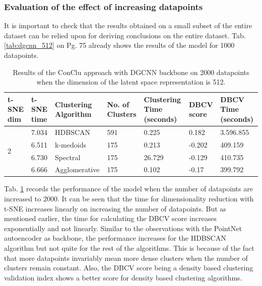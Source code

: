\subsubsection{Evaluation of the effect of increasing datapoints} 
It is important to check that the results obtained on a small subset of the entire dataset can be relied upon for deriving conclusions on the entire dataset. Tab. \ref{tab:dgcnn_512} on Pg. 75 already shows the results of the model for 1000 datapoints.
\begin{table}[H]
  \setlength\extrarowheight{10pt}
  \caption{Results of the ConClu approach with \ac{DGCNN} backbone on 2000 datapoints when the dimension of the latent space representation is 512.}
  \centering
  \begin{tabular}{|p{30pt}|p{50pt}|p{60pt}|p{50pt}|p{50pt}|p{50pt}|p{40pt}|}
    \toprule
    \ac{t-SNE} dim	& \ac{t-SNE} time & Clustering Algorithm & No. of Clusters & Clustering Time (seconds) & \ac{DBCV} score & \ac{DBCV} Time (seconds)\\
    \midrule
    \multirow{4}{30pt}{2}	& 7.034	& \ac{HDBSCAN}	& 591	& 0.225	& 0.182	& 3.596.855 \\ \cline{2-7} 
    & 6.511	& k-medoids	& 175	& 0.213	& -0.202	& 409.159 \\ \cline{2-7} 
    & 6.730	& Spectral	& 175	& 26.729	& -0.129	& 410.735 \\ \cline{2-7}
    & 6.666	& Agglomerative	& 175	& 0.102	& -0.17	& 399.792 \\ 
    \bottomrule
  \end{tabular}
  \label{tab:dgcnn_2000}
\end{table}

Tab. \ref{tab:dgcnn_2000} records the performance of the model when the number of datapoints are increased to 2000. It can be seen that the time for dimensionality reduction with \ac{t-SNE} increases linearly on increasing the number of datapoints. But as mentioned earlier, the time for calculating the \ac{DBCV} score increases exponentially and not linearly. Similar to the observations with the PointNet autoencoder as backbone, the performance increases for the \ac{HDBSCAN} algorithm but not quite for the rest of the algorithms. This is because of the fact that more datapoints invariably mean more dense clusters when the number of clusters remain constant. Also, the \ac{DBCV} score  being a density based clustering validation index shows a better score for density based clustering algorithms. 

